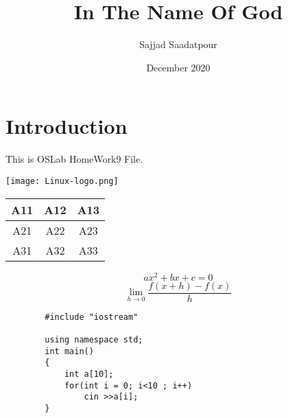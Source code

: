 \documentclass{article}
\title{In The Name Of God}
\author{Sajjad Saadatpour}
\date{December 2020}
\begin{document}
    \maketitle
    \section*{Introduction}
       This is OSLab HomeWork9 File.
       
    \begin{center}
        \texttt{[image: Linux-logo.png]}
    \end{center}
    
    \begin{center}
        \begin{tabular}{ |c|c|c| } 
            \hline
                A11 & A12 & A13 \\ \hline
                A21 & A22 & A23 \\ \hline
                A31 & A32 & A33 \\ 
            \hline
        \end{tabular}
    \end{center}
    
    \[ ax^2 + bx + c = 0 \]
    \[
        \lim_{h \rightarrow 0 } \frac{f(x+h)-f(x)}{h}
    \]
    
    \begin{lstlisting}
        #include "iostream"
       
        using namespace std;
        int main()
        {
            int a[10];
            for(int i = 0; i<10 ; i++)
                cin >>a[i];
        }

    \end{lstlisting}

\end{document}
